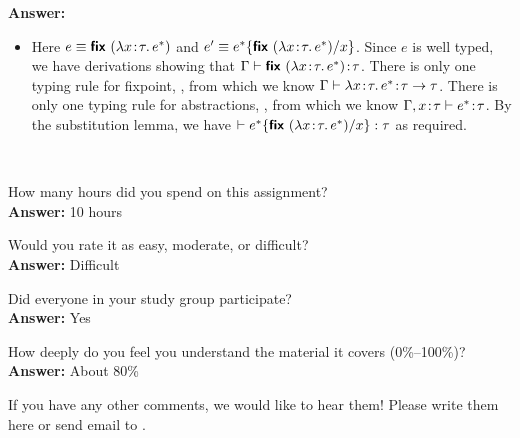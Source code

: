\documentclass[11pt]{article}
\begin{document}
\begin{exercise}
\begin{enumerate}
\newline
\textbf{Answer:}
	\begin{itemize}
		\item {} \newline
		Here $e \equiv \typ{fix}\ (\lam{x\ty\tau}{e^{\ast}})$ and $e' \equiv e^{\ast}\{\typ{fix}\ 
		(\lam{x\ty\tau}{e^{\ast}})/x\}$. Since $e$ is well typed, we have derivations showing that
		$\Gamma \vdash \typ{fix}\ (\lam{x\ty\tau}{e^{\ast}})\ty\tau$. There is only one typing rule for fixpoint, 
		\rulename{T-Fix}, from which we know $\Gamma \vdash \lambda x\!:\!\tau.\,e^{\ast}\!:\!\tau \rightarrow \tau$.
		There is only one typing rule for abstractions,
		, from which we know $\Gamma,x\!:\!\tau \vdash e^{\ast}\!:\!\tau$. By the substitution lemma,
		we have $\vdash e^{\ast}\{\textsf{\textbf{fix}}\ (\lambda x\!:\!\tau.\,e^{\ast})/x\}:\tau$ as required. 
	\end{itemize}
\end{enumerate}

\end{exercise}



\begin{debriefing} \hfill\\[-4ex]
\begin{enumerate*}
\item How many hours did you spend on this assignment?\\[0.5mm]
\noindent \textbf{Answer:} 10 hours
\item Would you rate it as easy, moderate, or difficult?\\[0.5mm]
\noindent \textbf{Answer:} Difficult
\item Did everyone in your study group participate?\\[0.5mm]
\noindent \textbf{Answer:} Yes 
\item How deeply do you feel you understand the material it covers (0\%--100\%)?\\[0.5mm]
\noindent \textbf{Answer:} About 80\%
\item If you have any other comments, we would like to hear them!
  Please write them here or send email to
  .
\end{enumerate*}
\end{debriefing}
\end{document}
